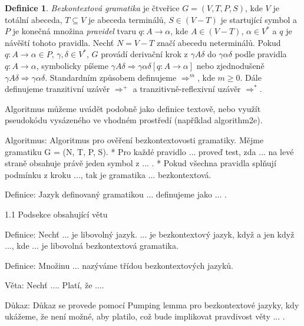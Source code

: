 \documentclass[11pt, a4paper, twocolumn]{article}
\theoremstyle{definition}
\newtheorem{definice}{Definice}[section]
\begin{document}
	\begin{definice}
	\emph{Bezkontextová gramatika} je čtveřice $G=(V,T,P,S)$, kde $V$ je totální abeceda,
	$T \subseteq V$ je abeceda terminálů, $S \in (V-T)$ je startující symbol a $P$ je konečná množina \emph{pravidel} tvaru $q: A \rightarrow \alpha$, kde $A \in (V - T)$, $\alpha \in V^*$ a $q$ je návěští tohoto pravidla. Nechť $N = V - T$ značí abecedu neterminálů.
	Pokud $q: A \rightarrow \alpha \in P$, $\gamma,\delta \in V^*$, $G$ provádí derivační krok z $\gamma A \delta$ do $\gamma \alpha \delta$ podle pravidla $q: A \rightarrow \alpha$, symbolicky píšeme $\gamma A \delta \Rightarrow \gamma \alpha \delta [q: A \rightarrow \alpha]$ nebo zjednodušeně $\gamma A \delta \Rightarrow \gamma \alpha \delta$. Standardním způsobem definujeme $\Rightarrow^m$, kde $m \geq 0$. Dále definujeme tranzitivní uzávěr $\Rightarrow^+$ a tranzitivně-reflexivní uzávěr $\Rightarrow^*$.
	\end{definice}

	Algoritmus můžeme uvádět podobně jako definice textově, nebo využít pseudokódu vysázeného ve vhodném prostředí (například algorithm2e).

	Algoritmus: Algoritmus pro ověření bezkontextovosti gramatiky. Mějme gramatiku G = (N, T, P, S).
	 * Pro každé pravidlo ... proveď test, zda ... na levé straně obsahuje právě jeden symbol z ... .
	 * Pokud všechna pravidla splňují podmínku z kroku ..., tak je gramatika ... bezkontextová.

	Definice: Jazyk definovaný gramatikou ... definujeme jako ... .

	1.1 Podsekce obsahující větu

	Definice: Nechť ... je libovolný jazyk. ... je bezkontextový jazyk, když a jen když ..., kde ... je libovolná bezkontextová gramatika.

	Definice: Množinu ... nazýváme třídou bezkontextových jazyků.

	Věta: Nechť .... Platí, že ....

	Důkaz: Důkaz se provede pomocí Pumping lemma pro bezkontextové jazyky, kdy ukážeme, že není možné, aby platilo, což bude implikovat pravdivost věty ... .
\end{document}
